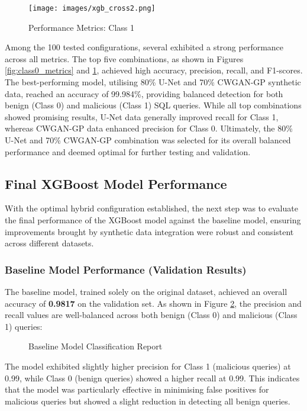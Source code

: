 \documentclass[journal]{IEEEtran}
\begin{document}
\begin{figure}[H]
    \centering
    \texttt{[image: images/xgb\_cross2.png]}
    \caption{Performance Metrics: Class 1}
    \label{fig:class1_metrics}
\end{figure}

Among the 100 tested configurations, several exhibited a strong performance across all metrics. The top five combinations, as shown in Figures \ref{fig:class0_metrics} and \ref{fig:class1_metrics}, achieved high accuracy, precision, recall, and F1-scores. The best-performing model, utilising 80\% U-Net and 70\% CWGAN-GP synthetic data, reached an accuracy of 99.984\%, providing balanced detection for both benign (Class 0) and malicious (Class 1) SQL queries. While all top combinations showed promising results, U-Net data generally improved recall for Class 1, whereas CWGAN-GP data enhanced precision for Class 0. Ultimately, the 80\% U-Net and 70\% CWGAN-GP combination was selected for its overall balanced performance and deemed optimal for further testing and validation.

\subsection{Final XGBoost Model Performance}

With the optimal hybrid configuration established, the next step was to evaluate the final performance of the XGBoost model against the baseline model, ensuring improvements brought by synthetic data integration were robust and consistent across different datasets.

\subsubsection{Baseline Model Performance (Validation Results)}
The baseline model, trained solely on the original dataset, achieved an overall accuracy of \textbf{0.9817} on the validation set. As shown in Figure \ref{fig:basemod}, the precision and recall values are well-balanced across both benign (Class 0) and malicious (Class 1) queries:

\setlength\fboxrule{0.5pt} 
\begin{figure}[H]
    \centering
    \caption{Baseline Model Classification Report}
    \label{fig:basemod}
\end{figure}

The model exhibited slightly higher precision for Class 1 (malicious queries) at 0.99, while Class 0 (benign queries) showed a higher recall at 0.99. This indicates that the model was particularly effective in minimising false positives for malicious queries but showed a slight reduction in detecting all benign queries.
\end{document}
